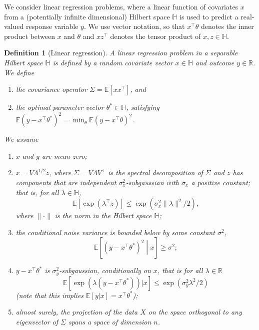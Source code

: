 \documentclass[11pt,notitlepage]{article}
\newcommand\bbH{\mathbb{H}}
\newcommand\E {\mathbb{E}}
\newcommand\Expect{\E}
\newcommand\R {\mathbb{R}}
\renewcommand\Re{\R}
\newtheorem{definition}[theorem]{Definition}
\begin{document}
We consider linear regression problems, where a linear function of
covariates $x$ from a (potentially infinite dimensional) Hilbert
space $\bbH$ is used to predict a real-valued response variable $y$.
We use vector notation, so that $x^\top\theta$ denotes the inner
product between $x$ and $\theta$
and $xz^\top$ denotes the tensor product of $x,z\in \bbH$.

\begin{definition}[Linear regression]\label{def:linreg}
  A linear regression problem in a separable Hilbert space $\bbH$
  is defined by a random covariate vector $x\in\bbH$ and outcome
  $y\in\Re$. We define
    \begin{enumerate}
      \item the {\em covariance operator} $\Sigma=\Expect[x x^\top]$,
      and
      \item the {\em optimal parameter vector}
      $\theta^*\in\bbH$, satisfying
      $\Expect(y-x^\top\theta^*)^2=\min_\theta
      \Expect(y-x^\top\theta)^2$.
    \end{enumerate}
   We assume
   \begin{enumerate}
   	\item\label{assumption:meanzero}
    $x$ and $y$ are mean zero;
    \item\label{assumption:subgaussiandata}
    $x = V\Lambda^{1/2} z$, where $\Sigma=V\Lambda V^\top$
    is the spectral decomposition of $\Sigma$ and $z$ has components
    that are independent $\sigma_x^2$-subgaussian with $\sigma_x$ a
    positive constant; that is, for all $\lambda \in \bbH$, 
      \[
    	\E[\exp(\lambda^\top z)] \leq \exp(\sigma_x^2\|\lambda\|^2/2),
   	  \]
   	where $\|\cdot\|$ is the norm in the Hilbert space $\bbH$;
   	\item%
    the {\em conditional noise variance} is bounded below by some constant $\sigma^2$,
   	\[
	   	\Expect\left[(y-x^\top\theta^*)^2\middle|x\right] \geq \sigma^2;
	\]
   	\item%
    $y - x^\top\theta^\ast$ is $\sigma_y^2$-subgaussian, conditionally on $x$, that is for all $\lambda \in \Re$
   	\[
   	\E[\exp(\lambda(y - x^\top\theta^\ast))|x] \leq \exp(\sigma_y^2\lambda^2/2)
   	\]
   	(note that this implies $\E[y|x] = x^\top\theta^*$);
    \item \label{assumption:full_rank}
  almost surely, the projection of the
  data $X$ on the space orthogonal to any eigenvector of $\Sigma$
  spans a space of dimension $n$.
   	\end{enumerate}

\end{definition}
\end{document}
